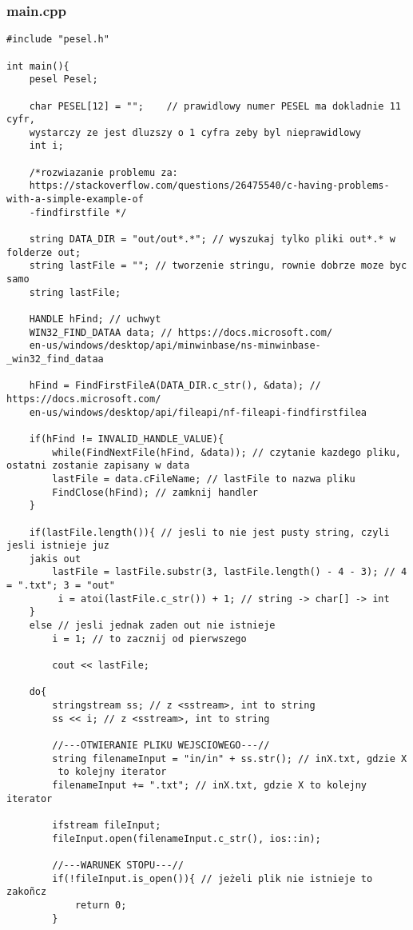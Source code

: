 \documentclass[12pt,a4paper]{article}
\begin{document}
	\subsubsection*{main.cpp}
	\begin{verbatim}
#include "pesel.h"

int main(){
    pesel Pesel;

    char PESEL[12] = "";	// prawidlowy numer PESEL ma dokladnie 11 cyfr, 
    wystarczy ze jest dluzszy o 1 cyfra zeby byl nieprawidlowy
    int i;

	/*rozwiazanie problemu za:
	https://stackoverflow.com/questions/26475540/c-having-problems-with-a-simple-example-of
	-findfirstfile */

    string DATA_DIR = "out/out*.*"; // wyszukaj tylko pliki out*.* w folderze out; 
    string lastFile = ""; // tworzenie stringu, rownie dobrze moze byc samo 
    string lastFile;

    HANDLE hFind; // uchwyt
    WIN32_FIND_DATAA data; // https://docs.microsoft.com/
    en-us/windows/desktop/api/minwinbase/ns-minwinbase-_win32_find_dataa

    hFind = FindFirstFileA(DATA_DIR.c_str(), &data); // https://docs.microsoft.com/
    en-us/windows/desktop/api/fileapi/nf-fileapi-findfirstfilea

    if(hFind != INVALID_HANDLE_VALUE){
        while(FindNextFile(hFind, &data)); // czytanie kazdego pliku, ostatni zostanie zapisany w data
        lastFile = data.cFileName; // lastFile to nazwa pliku
        FindClose(hFind); // zamknij handler
    }

	if(lastFile.length()){ // jesli to nie jest pusty string, czyli jesli istnieje juz 
	jakis out
		lastFile = lastFile.substr(3, lastFile.length() - 4 - 3); // 4 = ".txt"; 3 = "out"
		 i = atoi(lastFile.c_str()) + 1; // string -> char[] -> int
	}
	else // jesli jednak zaden out nie istnieje
		i = 1; // to zacznij od pierwszego

		cout << lastFile;

    do{
		stringstream ss; // z <sstream>, int to string
		ss << i; // z <sstream>, int to string

		//---OTWIERANIE PLIKU WEJSCIOWEGO---//
        string filenameInput = "in/in" + ss.str(); // inX.txt, gdzie X
         to kolejny iterator
		filenameInput += ".txt"; // inX.txt, gdzie X to kolejny iterator

		ifstream fileInput;
		fileInput.open(filenameInput.c_str(), ios::in);

		//---WARUNEK STOPU---//
		if(!fileInput.is_open()){ // jeżeli plik nie istnieje to zakoñcz
            return 0;
		}


\end{verbatim}
\end{document}
